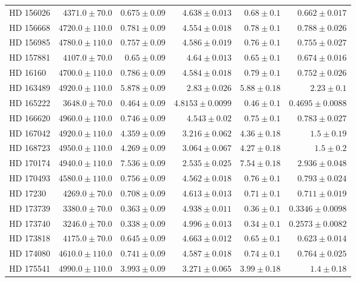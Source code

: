 \begin{longtable*}{lrrrrr}
HD 156026 & $4371.0\pm 70.0$ & $0.675\pm 0.09$ & $4.638\pm 0.013$ & $0.68\pm 0.1$ & $0.662\pm 0.017$ \\ 
HD 156668 & $4720.0\pm 110.0$ & $0.781\pm 0.09$ & $4.554\pm 0.018$ & $0.78\pm 0.1$ & $0.788\pm 0.026$ \\ 
HD 156985 & $4780.0\pm 110.0$ & $0.757\pm 0.09$ & $4.586\pm 0.019$ & $0.76\pm 0.1$ & $0.755\pm 0.027$ \\ 
HD 157881 & $4107.0\pm 70.0$ & $0.65\pm 0.09$ & $4.64\pm 0.013$ & $0.65\pm 0.1$ & $0.674\pm 0.016$ \\ 
HD 16160 & $4700.0\pm 110.0$ & $0.786\pm 0.09$ & $4.584\pm 0.018$ & $0.79\pm 0.1$ & $0.752\pm 0.026$ \\ 
HD 163489 & $4920.0\pm 110.0$ & $5.878\pm 0.09$ & $2.83\pm 0.026$ & $5.88\pm 0.18$ & $2.23\pm 0.1$ \\ 
HD 165222 & $3648.0\pm 70.0$ & $0.464\pm 0.09$ & $4.8153\pm 0.0099$ & $0.46\pm 0.1$ & $0.4695\pm 0.0088$ \\ 
HD 166620 & $4960.0\pm 110.0$ & $0.746\pm 0.09$ & $4.543\pm 0.02$ & $0.75\pm 0.1$ & $0.783\pm 0.027$ \\ 
HD 167042 & $4920.0\pm 110.0$ & $4.359\pm 0.09$ & $3.216\pm 0.062$ & $4.36\pm 0.18$ & $1.5\pm 0.19$ \\ 
HD 168723 & $4950.0\pm 110.0$ & $4.269\pm 0.09$ & $3.064\pm 0.067$ & $4.27\pm 0.18$ & $1.5\pm 0.2$ \\ 
HD 170174 & $4940.0\pm 110.0$ & $7.536\pm 0.09$ & $2.535\pm 0.025$ & $7.54\pm 0.18$ & $2.936\pm 0.048$ \\ 
HD 170493 & $4580.0\pm 110.0$ & $0.756\pm 0.09$ & $4.562\pm 0.018$ & $0.76\pm 0.1$ & $0.793\pm 0.024$ \\ 
HD 17230 & $4269.0\pm 70.0$ & $0.708\pm 0.09$ & $4.613\pm 0.013$ & $0.71\pm 0.1$ & $0.711\pm 0.019$ \\ 
HD 173739 & $3380.0\pm 70.0$ & $0.363\pm 0.09$ & $4.938\pm 0.011$ & $0.36\pm 0.1$ & $0.3346\pm 0.0098$ \\ 
HD 173740 & $3246.0\pm 70.0$ & $0.338\pm 0.09$ & $4.996\pm 0.013$ & $0.34\pm 0.1$ & $0.2573\pm 0.0082$ \\ 
HD 173818 & $4175.0\pm 70.0$ & $0.645\pm 0.09$ & $4.663\pm 0.012$ & $0.65\pm 0.1$ & $0.623\pm 0.014$ \\ 
HD 174080 & $4610.0\pm 110.0$ & $0.741\pm 0.09$ & $4.587\pm 0.018$ & $0.74\pm 0.1$ & $0.764\pm 0.025$ \\ 
HD 175541 & $4990.0\pm 110.0$ & $3.993\pm 0.09$ & $3.271\pm 0.065$ & $3.99\pm 0.18$ & $1.4\pm 0.18$ \\ 

\end{longtable*}
